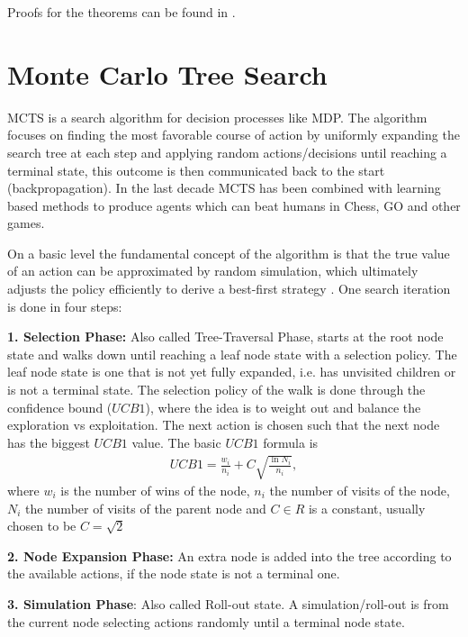 Proofs for the theorems can be found in \cite[Chapter~17]{ml_foundations}.
\section{Monte Carlo Tree Search}
MCTS is a search algorithm for decision processes like MDP. The algorithm
focuses on finding the most favorable course of action by uniformly expanding
the search tree at each step and applying random actions/decisions until
reaching a terminal state, this outcome is then communicated back to the
start (backpropagation). In the last decade MCTS has been combined
with learning based methods \cite{alphazero} to produce agents which can beat
humans in Chess, GO and other games.
\newline

On a basic level the fundamental concept of the algorithm is that the true
value of an action can be approximated by random simulation, which ultimately
adjusts the policy efficiently to derive a best-first strategy
\cite{mcts_survey}. One search iteration is done in four steps:
\newline

\textbf{1. Selection Phase:} Also called Tree-Traversal Phase, starts at the
root node state and walks down until reaching a leaf node state with a
selection policy. The leaf node state is one that is not yet fully expanded,
i.e. has unvisited children or is not a terminal state. The selection policy of
the walk is done through the confidence bound ($UCB1$), where the idea
is to weight out and balance the exploration vs exploitation. The next action
is chosen such that the next node has the biggest $UCB1$ value. The basic
$UCB1$ formula is
\begin{align}
    UCB1 = \frac{w_i}{n_i} + C \sqrt{\frac{\ln N_i}{n_i}},
\end{align}
where $w_i$ is the number of wins of the node, $n_i$ the number of visits of
the node, $N_i$ the number of visits of the parent node and $C\in R$ is a
constant, usually chosen to be $C = \sqrt{2}$
\newline

\textbf{2. Node Expansion Phase:} An extra node is added into the tree according
to the available actions, if the node state is not a terminal one.
\newline

\textbf{3. Simulation Phase}: Also called Roll-out state. A simulation/roll-out
is from the current node selecting actions randomly until a terminal node
state.
\newline

